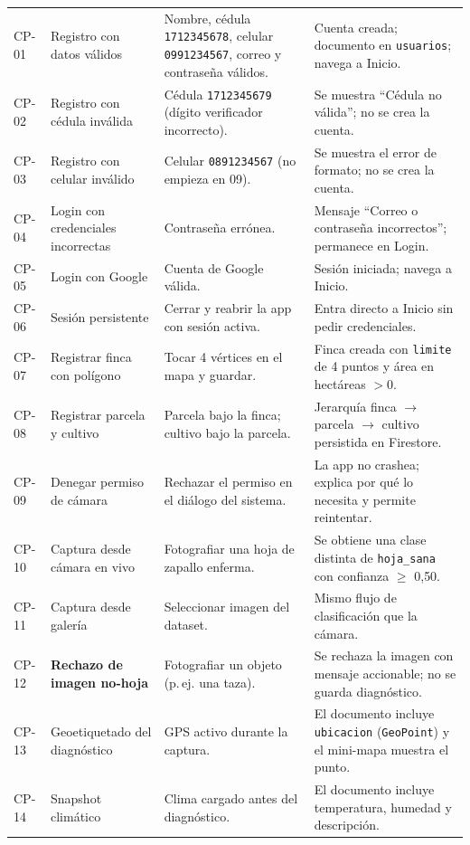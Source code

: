 \documentclass[12pt,a4paper]{article}
\begin{document}
\begin{longtable}{p{1.2cm} p{3.6cm} p{4.4cm} p{3.9cm}}
CP-01 & Registro con datos válidos & Nombre, cédula \texttt{1712345678}, celular \texttt{0991234567}, correo y contraseña válidos. & Cuenta creada; documento en \texttt{usuarios}; navega a Inicio. \\
CP-02 & Registro con cédula inválida & Cédula \texttt{1712345679} (dígito verificador incorrecto). & Se muestra ``Cédula no válida''; no se crea la cuenta. \\
CP-03 & Registro con celular inválido & Celular \texttt{0891234567} (no empieza en 09). & Se muestra el error de formato; no se crea la cuenta. \\
CP-04 & Login con credenciales incorrectas & Contraseña errónea. & Mensaje ``Correo o contraseña incorrectos''; permanece en Login. \\
CP-05 & Login con Google & Cuenta de Google válida. & Sesión iniciada; navega a Inicio. \\
CP-06 & Sesión persistente & Cerrar y reabrir la app con sesión activa. & Entra directo a Inicio sin pedir credenciales. \\
CP-07 & Registrar finca con polígono & Tocar 4 vértices en el mapa y guardar. & Finca creada con \texttt{limite} de 4 puntos y área en hectáreas $>0$. \\
CP-08 & Registrar parcela y cultivo & Parcela bajo la finca; cultivo bajo la parcela. & Jerarquía finca $\rightarrow$ parcela $\rightarrow$ cultivo persistida en Firestore. \\
CP-09 & Denegar permiso de cámara & Rechazar el permiso en el diálogo del sistema. & La app no crashea; explica por qué lo necesita y permite reintentar. \\
CP-10 & Captura desde cámara en vivo & Fotografiar una hoja de zapallo enferma. & Se obtiene una clase distinta de \texttt{hoja\_sana} con confianza $\geq$ 0{,}50. \\
CP-11 & Captura desde galería & Seleccionar imagen del dataset. & Mismo flujo de clasificación que la cámara. \\
CP-12 & \textbf{Rechazo de imagen no-hoja} & Fotografiar un objeto (p.\,ej. una taza). & Se rechaza la imagen con mensaje accionable; no se guarda diagnóstico. \\
CP-13 & Geoetiquetado del diagnóstico & GPS activo durante la captura. & El documento incluye \texttt{ubicacion} (\texttt{GeoPoint}) y el mini-mapa muestra el punto. \\
CP-14 & Snapshot climático & Clima cargado antes del diagnóstico. & El documento incluye temperatura, humedad y descripción. \\

\end{longtable}
\end{document}
